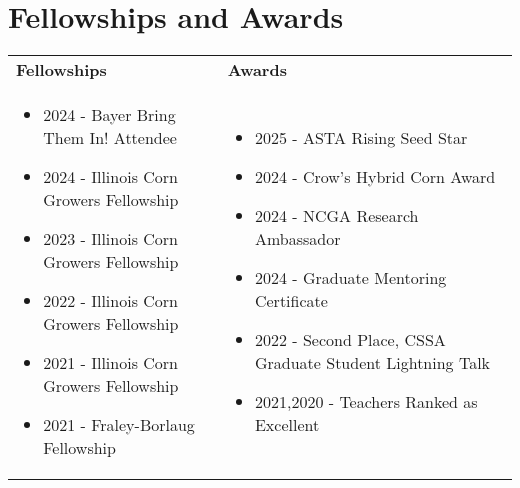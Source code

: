 \section*{Fellowships and Awards}

\begin{tabularx}{\textwidth}{X X} %
 \textbf{Fellowships} & \textbf{Awards} \\[0.5em]
      \begin{itemize}[leftmargin=*]
        \item 2024 - Bayer Bring Them In! Attendee
        \item 2024 - Illinois Corn Growers Fellowship %
        \item 2023 - Illinois Corn Growers Fellowship %
        \item 2022 - Illinois Corn  Growers Fellowship %
        \item 2021 - Illinois Corn Growers Fellowship %
        \item 2021 - Fraley-Borlaug Fellowship %
    \end{itemize}
&
\begin{itemize}[leftmargin=*]
        \item 2025 - ASTA Rising Seed Star
        \item 2024 - Crow's Hybrid Corn Award %
        \item 2024 - NCGA Research Ambassador %
        \item 2024 - Graduate Mentoring Certificate
        \item 2022 - Second Place, CSSA Graduate Student Lightning Talk
        \item 2021,2020 - Teachers Ranked as Excellent %
    \end{itemize}
\end{tabularx}

